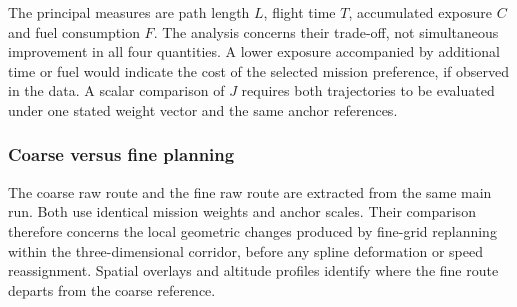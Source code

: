 The principal measures are path length $L$, flight time $T$, accumulated
exposure $C$ and fuel consumption $F$. The analysis concerns their
trade-off, not simultaneous improvement in all four quantities. A lower
exposure accompanied by additional time or fuel would indicate the cost
of the selected mission preference, if observed in the data. A scalar
comparison of $J$ requires both trajectories to be evaluated under one
stated weight vector and the same anchor references.


\subsubsection{Coarse versus fine planning}
\label{sec:resolution_comparison}

The coarse raw route and the fine raw route are extracted from the same
main run. Both use identical mission weights and anchor scales. Their
comparison therefore concerns the local geometric changes produced by
fine-grid replanning within the three-dimensional corridor, before any
spline deformation or speed reassignment. Spatial overlays and altitude
profiles identify where the fine route departs from the coarse reference.

